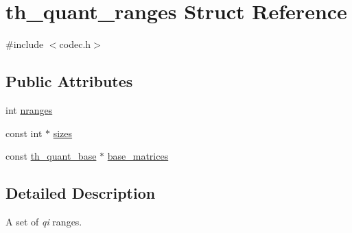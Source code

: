 \hypertarget{structth__quant__ranges}{\section{th\+\_\+quant\+\_\+ranges Struct Reference}
\label{structth__quant__ranges}
}


{\ttfamily \#include $<$codec.\+h$>$}

\subsection*{Public Attributes}
\begin{DoxyCompactItemize}
\item 
int \hyperlink{structth__quant__ranges_a53e5a3d7f7a112100b4b670929b3ebab}{nranges}
\item 
const int $\ast$ \hyperlink{structth__quant__ranges_af3188a373bc0b8ffaa330d0ab4c1a194}{sizes}
\item 
const \hyperlink{theora_2libtheora-1_81_81_2include_2theora_2codec_8h_a6a1426d16beef8a311d7f0e9d2e96326}{th\+\_\+quant\+\_\+base} $\ast$ \hyperlink{structth__quant__ranges_a52cb432f034737087492ea448de20bdb}{base\+\_\+matrices}
\end{DoxyCompactItemize}


\subsection{Detailed Description}
A set of {\itshape qi} ranges. 

